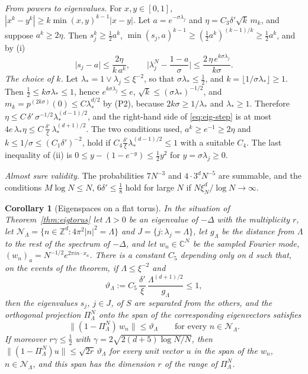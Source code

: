 \documentclass[11pt,a4paper]{article}
\makeatletter
\theoremstyle{stmt}
\newtheorem{corollary}[theorem]{Corollary}
\theoremstyle{defn}
\theoremstyle{rmk}
\renewenvironment{proof}[1][\proofname]{\par\pushQED{\qed}\normalfont\topsep6\p@\@plus6\p@\relax
  \trivlist\item[\hskip\labelsep{\sffamily\itshape\small #1.}]\ignorespaces}{\popQED\endtrivlist\@endpefalse}
\numberwithin{equation}{section}
\makeatother
\begin{document}
{\begin{proof}
\emph{From powers to eigenvalues.} For $x,y\in[0,1]$, $|x^k-y^k|\ge k\min(x,y)^{k-1}|x-y|$. Let $a=e^{-\sigma\lambda_j}$ and $\eta=C_3\delta'\sqrt k\,m_k$, and suppose $a^k\ge2\eta$. Then $s_j^k\ge\frac12a^k$, $\min(s_j,a)^{k-1}\ge(\frac12a^k)^{(k-1)/k}\ge\frac12a^k$, and by (i)
\begin{equation}\label{eq:eig-step}
\big|s_j-a\big|\le\frac{2\eta}{k\,a^k},\qquad\Big|\lambda^N_j-\frac{1-a}{\sigma}\Big|\le\frac{2\,\eta\,e^{k\sigma\lambda_j}}{k\sigma}.
\end{equation}
\emph{The choice of $k$.} Let $\lambda_*=1\vee\lambda_j\le\xi^{-2}$, so that $\sigma\lambda_*\le\frac12$, and $k=\lfloor1/\sigma\lambda_*\rfloor\ge1$. Then $\frac12\le k\sigma\lambda_*\le1$, hence $e^{k\sigma\lambda_j}\le e$, $\sqrt k\le(\sigma\lambda_*)^{-1/2}$, and $m_k=p^{(2k\sigma)}(0)\le C\lambda_*^{d/2}$ by (P2), because $2k\sigma\ge1/\lambda_*$ and $\lambda_*\ge1$. Therefore $\eta\le C\,\delta'\,\sigma^{-1/2}\lambda_*^{(d-1)/2}$, and the right-hand side of \eqref{eq:eig-step} is at most $4e\,\lambda_*\eta\le C\,\frac{\delta'}\xi\,\lambda_*^{(d+1)/2}$. The two conditions used, $a^k\ge e^{-1}\ge2\eta$ and $k\le1/\sigma\le(C_1\delta')^{-2}$, hold if $C_4\frac{\delta'}\xi\lambda_*^{(d-1)/2}\le1$ with a suitable $C_4$. The last inequality of (ii) is $0\le y-(1-e^{-y})\le\frac12y^2$ for $y=\sigma\lambda_j\ge0$.

\emph{Almost sure validity.} The probabilities $7N^{-3}$ and $4\cdot3^dN^{-5}$ are summable, and the conditions $M\log N\le N$, $6\delta'\le\frac18$ hold for large $N$ if $N\xi_N^{d}/\log N\to\infty$.
\end{proof}

\begin{corollary}[Eigenspaces on a flat torus]\label{cor:eigspace}
In the situation of Theorem~\ref{thm:eigtorus} let $\Lambda>0$ be an eigenvalue of $-\Delta$ with the multiplicity $r$, let $\mathcal N_\Lambda=\{n\in\mathbb Z^d:4\pi^2|n|^2=\Lambda\}$ and $J=\{j:\lambda_j=\Lambda\}$, let $g_\Lambda$ be the distance from $\Lambda$ to the rest of the spectrum of $-\Delta$, and let $w_n\in\mathbb C^N$ be the sampled Fourier mode, $(w_n)_a=N^{-1/2}e^{2\pi in\cdot x_a}$. There is a constant $C_5$ depending only on $d$ such that, on the events of the theorem, if $\Lambda\le\xi^{-2}$ and
\[
\vartheta_\Lambda:=C_5\,\frac{\delta'}{\xi}\,\frac{\Lambda^{(d+1)/2}}{g_\Lambda}\le1,
\]
then the eigenvalues $s_j$, $j\in J$, of $S$ are separated from the others, and the orthogonal projection $\Pi^N_\Lambda$ onto the span of the corresponding eigenvectors satisfies
\[
\big\|(1-\Pi^N_\Lambda)\,w_n\big\|\le\vartheta_\Lambda\qquad\text{for every }n\in\mathcal N_\Lambda .
\]
If moreover $r\gamma\le\frac12$ with $\gamma=2\sqrt{2(d+5)\log N/N}$, then $\|(1-\Pi^N_\Lambda)u\|\le\sqrt{2r}\,\vartheta_\Lambda$ for every unit vector $u$ in the span of the $w_n$, $n\in\mathcal N_\Lambda$, and this span has the dimension $r$ of the range of $\Pi^N_\Lambda$.
\end{corollary}

}
\end{document}
